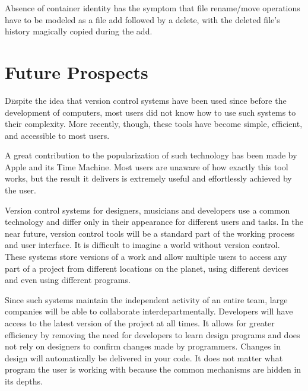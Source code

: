 \documentclass[twoside]{article}
\begin{document}
\begin{multicols}{2}
Absence of container identity has the symptom that file rename/move operations have to be modeled as a file add followed by a delete, with the deleted file's history magically copied during the add.



\section{Future Prospects}
\lettrine[nindent=0em,lines=3]{D}espite the idea that version control systems have been used since before the development of computers, most users did not know how to use such systems to their complexity. More recently, though, these tools have become simple, efficient, and accessible to most users.

A great contribution to the popularization of such technology has been made by Apple and its Time Machine. Most users are unaware of how exactly this tool works, but the result it delivers is extremely useful and effortlessly achieved by the user.

Version control systems for designers, musicians and developers use a common technology and differ only in their appearance for different users and tasks. In the near future, version control tools will be a standard part of the working process and user interface. It is difficult to imagine a world without version control. These systems store versions of a work and allow multiple users to access any part of a project from different locations on the planet, using different devices and even using different programs.

Since such systems maintain the independent activity of an entire team, large companies will be able to collaborate interdepartmentally. Developers will have access to the latest version of the project at all times. It allows for greater efficiency by removing the need for developers to learn design programs and does not rely on designers to confirm changes made by programmers. Changes in design will automatically be delivered in your code. It does not matter what program the user is working with because the common mechanisms are hidden in its depths.



\begin{thebibliography}{99} %
 

\end{thebibliography}
\end{multicols}
\end{document}
